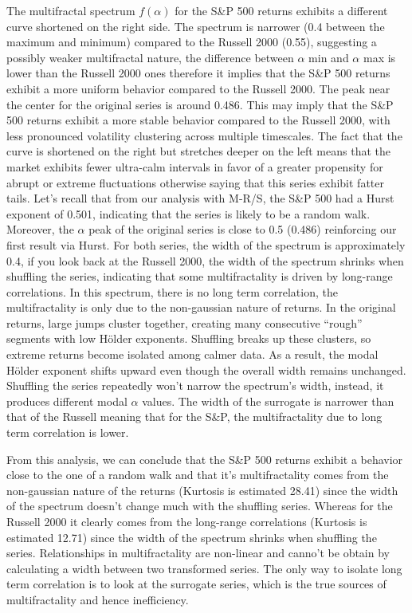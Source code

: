 \documentclass[11pt]{extarticle}
\begin{document}
The multifractal spectrum $f(\alpha)$ for the S\&P 500 returns exhibits a different curve shortened on the right side.
The spectrum is narrower (0.4 between the maximum and minimum) compared to the Russell 2000 (0.55),
suggesting a possibly weaker multifractal nature, the difference between $\alpha$ min and $\alpha$ max is lower than the Russell 2000 ones
therefore it implies that the S\&P 500 returns exhibit a more uniform behavior compared to the Russell 2000.
The peak near the center for the original series is around 0.486. This may imply that the S\&P 500 returns exhibit a more stable
behavior compared to the Russell 2000, with less pronounced volatility clustering across multiple timescales.
The fact that the curve is shortened on the right but stretches deeper on the left means that the market exhibits fewer
ultra-calm intervals in favor of a greater propensity for abrupt or extreme fluctuations otherwise saying that this series
exhibit fatter tails.
Let's recall that from our analysis with M-R/S, the S\&P 500 had a Hurst exponent of 0.501, indicating that the series is likely to be a random walk.
Moreover, the $\alpha$ peak of the original series is close to 0.5 (0.486)
reinforcing our first result via Hurst.
For both series, the width of the spectrum is approximately 0.4, if you look back at the Russell 2000, the width of the spectrum
shrinks when shuffling the series, indicating that some multifractality is driven by long-range correlations.
In this spectrum, there is no long term correlation, the multifractality is only due to the non-gaussian nature of returns.
In the original returns, large jumps cluster together, creating many consecutive “rough” segments with low Hölder exponents.
Shuffling breaks up these clusters, so extreme returns become isolated among calmer data.
As a result, the modal Hölder exponent shifts upward even though the overall width remains unchanged. Shuffling the
series repeatedly won’t narrow the spectrum’s width, instead, it produces different modal $\alpha$ values. The width of the surrogate
is narrower than that of the Russell meaning that for the S\&P, the multifractality due to long term correlation is lower.


From this analysis, we can conclude that the S\&P 500 returns exhibit a behavior close to the one of a random walk and
that it's multifractality comes from the non-gaussian nature of the returns (Kurtosis is estimated 28.41) since the width
of the spectrum doesn't change much with the shuffling series. Whereas for the Russell 2000 it clearly comes from the long-range
correlations (Kurtosis is estimated 12.71) since the width of the spectrum shrinks when shuffling the series.
Relationships in multifractality are non-linear and canno't be obtain by calculating a width between two transformed series.
The only way to isolate long term correlation is to look at the surrogate series, which is the true sources of multifractality and hence
inefficiency.
\end{document}
